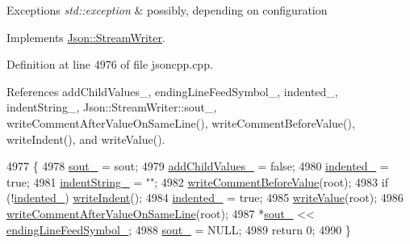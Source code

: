 \begin{DoxyExceptions}{Exceptions}
{\em std\+::exception} & possibly, depending on configuration \\
\hline
\end{DoxyExceptions}


Implements \hyperlink{class_json_1_1_stream_writer_a84278bad0c9a9fc587bc2a97c5bb5993}{Json\+::\+Stream\+Writer}.



Definition at line 4976 of file jsoncpp.\+cpp.



References add\+Child\+Values\+\_\+, ending\+Line\+Feed\+Symbol\+\_\+, indented\+\_\+, indent\+String\+\_\+, Json\+::\+Stream\+Writer\+::sout\+\_\+, write\+Comment\+After\+Value\+On\+Same\+Line(), write\+Comment\+Before\+Value(), write\+Indent(), and write\+Value().


\begin{DoxyCode}
4977 \{
4978   \hyperlink{class_json_1_1_stream_writer_a4f5603d4228a9fa46a42cb44e5234d9b}{sout\_} = sout;
4979   \hyperlink{struct_json_1_1_built_styled_stream_writer_abed9cc31da503b48798e7cea68c42e16}{addChildValues\_} = \textcolor{keyword}{false};
4980   \hyperlink{struct_json_1_1_built_styled_stream_writer_a6aa0ad023e623f600103631a6bca6d10}{indented\_} = \textcolor{keyword}{true};
4981   \hyperlink{struct_json_1_1_built_styled_stream_writer_a0f8115a4fb474ab0e9de25f10e5ca09a}{indentString\_} = \textcolor{stringliteral}{""};
4982   \hyperlink{struct_json_1_1_built_styled_stream_writer_a32c4afca4e08fba79bb0a80a8010283a}{writeCommentBeforeValue}(root);
4983   \textcolor{keywordflow}{if} (!\hyperlink{struct_json_1_1_built_styled_stream_writer_a6aa0ad023e623f600103631a6bca6d10}{indented\_}) \hyperlink{struct_json_1_1_built_styled_stream_writer_a2b38a3714d415c4bd3b4812897130f3d}{writeIndent}();
4984   \hyperlink{struct_json_1_1_built_styled_stream_writer_a6aa0ad023e623f600103631a6bca6d10}{indented\_} = \textcolor{keyword}{true};
4985   \hyperlink{struct_json_1_1_built_styled_stream_writer_a7c9da861861e570a51b45f270c9ff150}{writeValue}(root);
4986   \hyperlink{struct_json_1_1_built_styled_stream_writer_a89625b134fce0255263ca40e6125742b}{writeCommentAfterValueOnSameLine}(root);
4987   *\hyperlink{class_json_1_1_stream_writer_a4f5603d4228a9fa46a42cb44e5234d9b}{sout\_} << \hyperlink{struct_json_1_1_built_styled_stream_writer_a5e61a9a4b2af52b98900286c843b86f7}{endingLineFeedSymbol\_};
4988   \hyperlink{class_json_1_1_stream_writer_a4f5603d4228a9fa46a42cb44e5234d9b}{sout\_} = NULL;
4989   \textcolor{keywordflow}{return} 0;
4990 \}
\end{DoxyCode}
\mbox{\label{struct_json_1_1_built_styled_stream_writer_acd20e9274bbcf7876ef3af2e7d23a31f}} 
